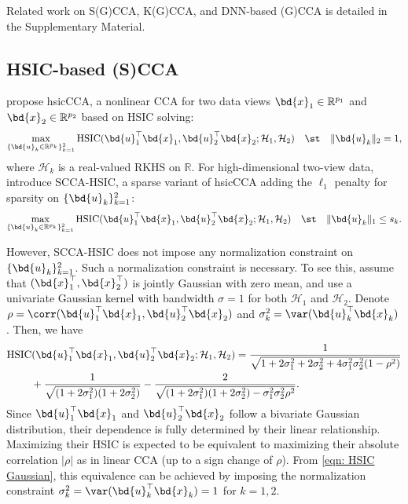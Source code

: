 Related work on S(G)CCA, K(G)CCA, and DNN-based (G)CCA is detailed in the Supplementary Material.


\subsection{HSIC-based (S)CCA}\label{sec: SCCA-HSIC}
\citet{chang2013canonical}
propose hsicCCA, a nonlinear  CCA
for two data views $\bd{x}_1\in \mathbb{R}^{p_1}$ and $\bd{x}_2\in \mathbb{R}^{p_2}$
based on HSIC solving:
\[
       \max_{\{\bd{u}_k\in \mathbb{R}^{p_k}\}_{k=1}^2}        
     \mathrm{HSIC}(\bd{u}_1^\top\bd{x}_1,\bd{u}_2^\top\bd{x}_2;\mathcal{H}_1,\mathcal{H}_2)
 \quad \st  \quad \| \bd{u}_k\|_2=1,
\]
where 
 $\mathcal{H}_k$ is 
a real-valued RKHS on $\mathbb{R}$.
For high-dimensional two-view data,
\citet{uurtio2018sparse}
introduce SCCA-HSIC, a sparse variant of hsicCCA adding
the $\ell_1$ penalty 
for sparsity on $\{\bd{u}_k\}_{k=1}^2$:
\[
       \max_{\{\bd{u}_k\in \mathbb{R}^{p_k}\}_{k=1}^2}        
     \mathrm{HSIC}(\bd{u}_1^\top\bd{x}_1,\bd{u}_2^\top\bd{x}_2;\mathcal{H}_1,\mathcal{H}_2)
 \quad \st  \quad \| \bd{u}_k\|_1\le s_k.
\]

However, SCCA-HSIC does not impose any normalization constraint
on $\{\bd{u}_k\}_{k=1}^2$. Such
a normalization constraint
is 
necessary. To see this,
assume that $(\bd{x}_1^\top,\bd{x}_2^\top)$ is jointly Gaussian with zero mean, and
use a univariate Gaussian kernel with bandwidth $\sigma=1$ for both $\mathcal{H}_1$ and $\mathcal{H}_2$.
Denote $\rho=\corr(\bd{u}_1^\top\bd{x}_1, \bd{u}_2^\top\bd{x}_2)$
and $\sigma_k^2=\var(\bd{u}_k^\top\bd{x}_k)$.
Then, we have
\begin{align}\label{eqn: HSIC Gaussian}
    & \mathrm{HSIC}(\bd{u}_1^\top\bd{x}_1,\bd{u}_2^\top\bd{x}_2;\mathcal{H}_1,\mathcal{H}_2)
     =\frac{1}{\sqrt{1+2\sigma_1^2+2\sigma_2^2+4\sigma_1^2\sigma_2^2(1-\rho^2)}}\nonumber\\
    &~\qquad+\frac{1}{\sqrt{(1+2\sigma_1^2)(1+2\sigma_2^2)}}
    -\frac{2}{\sqrt{(1+2\sigma_1^2)(1+2\sigma_2^2)-\sigma_1^2\sigma_2^2\rho^2}}.
\vspace{-0.5cm}\end{align}
Since $\bd{u}_1^\top\bd{x}_1$ and $\bd{u}_2^\top\bd{x}_2$ 
follow a bivariate Gaussian distribution,
their dependence is fully determined by their linear relationship.
Maximizing their
 HSIC is expected to be equivalent to
 maximizing their absolute correlation $|\rho|$ as in  linear CCA (up to a sign change of $\rho$).
 From \eqref{eqn: HSIC Gaussian},
this equivalence can be achieved by 
imposing the normalization constraint $\sigma_k^2=\var(\bd{u}_k^\top\bd{x}_k)=1$ for $k=1,2$.






